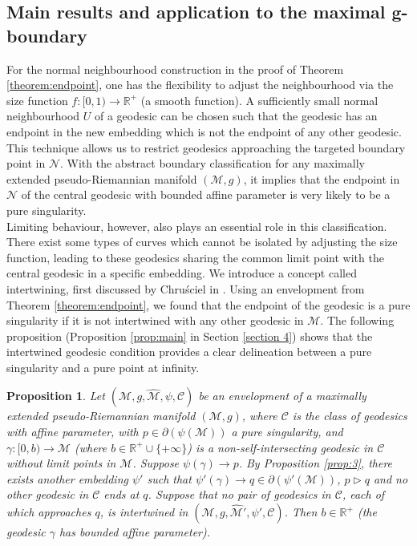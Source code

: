 \documentclass[pdflatex,sn-mathphys-num]{sn-jnl}
\newtheorem{prop}[theorem]{Proposition}
\theoremstyle{definition}
\begin{document}
\subsection{Main results and application to the maximal g-boundary}
For the normal neighbourhood construction in the proof of Theorem \ref{theorem:endpoint}, one has the flexibility to adjust the neighbourhood via the size function $f: [0,1) \rightarrow \mathbb{R}^+$ (a smooth function). A sufficiently small normal neighbourhood $U$ of a geodesic can be chosen such that the geodesic has an endpoint in the new embedding which is not the endpoint of any other geodesic. This technique allows us to restrict geodesics approaching the targeted boundary point in $\mathcal{N}$. With the abstract boundary classification for any maximally extended pseudo-Riemannian manifold $(\mathcal{M},g)$, it implies that the endpoint in $\mathcal{N}$ of the central geodesic with bounded affine parameter is very likely to be a pure singularity.\\

Limiting behaviour, however, also plays an essential role in this classification. There exist some types of curves which cannot be isolated by adjusting the size function, leading to these geodesics sharing the common limit point with the central geodesic in a specific embedding. We introduce a concept called intertwining, first discussed by Chru\'{s}ciel in \cite{chrusciel2006conformalboundaryextensionslorentzian}. Using an envelopment from Theorem \ref{theorem:endpoint}, we found that the endpoint of the geodesic is a pure singularity if it is not intertwined with any other geodesic in $\mathcal{M}$. The following proposition (Proposition \ref{prop:main} in Section \ref{section 4}) shows that the intertwined geodesic condition provides a clear delineation between a pure singularity and a pure point at infinity.

\begin{prop}\label{prop:main2}
    Let $(\mathcal{M},g,\hat{\mathcal{M}},\psi,\mathcal{C})$ be an envelopment of a maximally extended pseudo-Riemannian manifold $(\mathcal{M},g)$, where $\mathcal{C}$ is the class of geodesics with affine parameter, with $p \in \partial(\psi(\mathcal{M}))$ a pure singularity, and $\gamma: [0,b) \rightarrow \mathcal{M}$ (where $b \in \mathbb{R}^+ \cup \{+\infty\}$) is a non-self-intersecting geodesic in $\mathcal{C}$ without limit points in $\mathcal{M}$. Suppose $\psi(\gamma) \rightarrow p$. By Proposition \ref{prop:3}, there exists another embedding $\psi'$ such that $\psi'(\gamma) \rightarrow q \in \partial(\psi'(\mathcal{M}))$, $p \vartriangleright q$ and no other geodesic in $\mathcal{C}$ ends at $q$. Suppose that no pair of geodesics in $\mathcal{C}$, each of which approaches $q$, is intertwined in $(\mathcal{M},g,\hat{\mathcal{M}}',\psi',\mathcal{C})$. Then $b \in \mathbb{R}^{+}$ (the geodesic $\gamma$ has bounded affine parameter). 
\end{prop}
\end{document}
